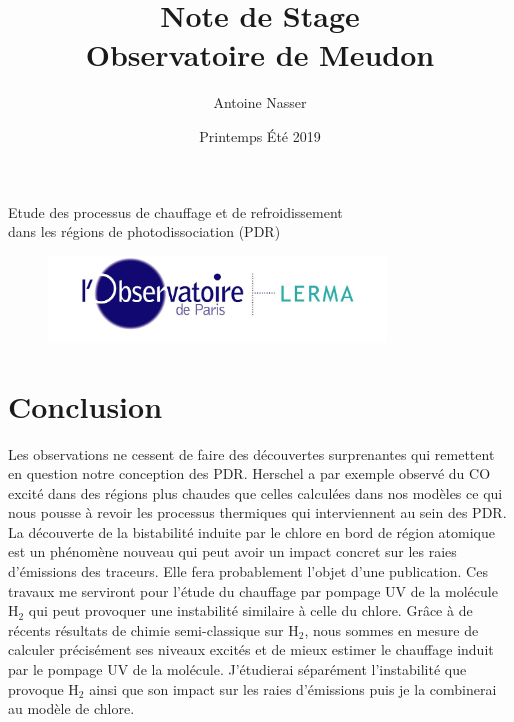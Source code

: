 \documentclass[11pt,a4paper]{article}
\title{Note de Stage\\Observatoire de Meudon}
\author{Antoine Nasser}
\date{Printemps Été 2019}
\begin{document}
\begin{spacing}{0.98}


\maketitle
\begin{center}{\Large Etude des processus de chauffage et de refroidissement \\ dans les régions de photodissociation (PDR)}\end{center}


\setcounter{secnumdepth}{4}
\vfill
\tableofcontents
\vfill
\begin{figure}[b!]
        \centering 
        \includegraphics[trim = {0 0 0 0cm},clip,width=0.8\textwidth]{figure/LERMA2.jpg}
\end{figure}
\vfill

\setcounter{figure}{0}    

\newpage
 










\newpage 
\section*{Conclusion}

Les observations ne cessent de faire des découvertes surprenantes qui remettent en question notre conception des PDR. Herschel a par exemple observé du $\mathrm{CO}$ excité dans des régions plus chaudes que celles calculées dans nos modèles ce qui nous pousse à revoir les processus thermiques qui interviennent au sein des PDR. La découverte de la bistabilité induite par le chlore en bord de région atomique est un phénomène nouveau qui peut avoir un impact concret sur les raies d'émissions des traceurs. Elle fera probablement l'objet d'une publication. Ces travaux me serviront pour l'étude du chauffage par pompage UV de la molécule $\mathrm{H}_2$ qui peut provoquer une instabilité similaire à celle du chlore. Grâce à de récents résultats de chimie semi-classique sur $\mathrm{H}_2$, nous sommes en mesure de calculer précisément ses niveaux excités et de mieux estimer le chauffage induit par le pompage UV de la molécule. J'étudierai séparément l'instabilité que provoque $\mathrm{H}_2$ ainsi que son impact sur les raies d'émissions puis je la combinerai au modèle de chlore. \newline 


\end{spacing}
\end{document}
